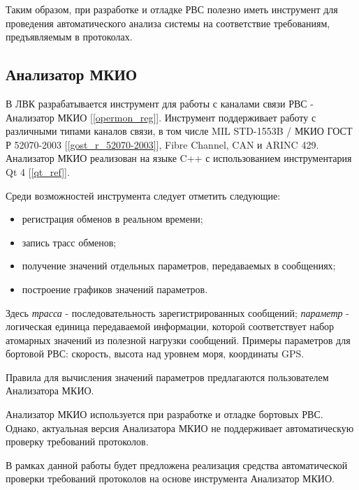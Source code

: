 Таким образом, при разработке и отладке РВС полезно иметь инструмент для 
проведения автоматического анализа системы на соответствие требованиям, 
предъявляемым в протоколах.

\subsection{Анализатор МКИО}

В ЛВК разрабатывается инструмент для работы с каналами связи РВС -  
Анализатор МКИО [\ref{opermon_reg}]. Инструмент поддерживает работу с  
различными типами каналов связи, в том числе MIL STD-1553B / МКИО ГОСТ Р 
52070-2003 [\ref{gost_r_52070-2003}], Fibre Channel, CAN и ARINC 429. 
Анализатор МКИО реализован на языке C++ с использованием инструментария Qt 4 
[\ref{qt_ref}].

Среди возможностей инструмента следует отметить следующие:

\begin{itemize}
 \item регистрация обменов в реальном времени;
 \item запись трасс обменов;
 \item получение значений отдельных параметров, передаваемых в сообщениях;
 \item построение графиков значений параметров.
\end{itemize}

Здесь \textit{трасса} - последовательность зарегистрированных сообщений; 
\textit{параметр} - логическая единица передаваемой информации, которой 
соответствует набор атомарных значений из полезной нагрузки сообщений. Примеры 
параметров для бортовой РВС: скорость, высота над уровнем моря, координаты GPS.

Правила для вычисления значений параметров предлагаются пользователем 
Анализатора МКИО.

Анализатор МКИО используется при разработке и отладке бортовых РВС. Однако, 
актуальная версия Анализатора МКИО не поддерживает автоматическую проверку 
требований протоколов. 

В рамках данной работы будет предложена реализация средства автоматической 
проверки требований протоколов на основе инструмента Анализатор МКИО.